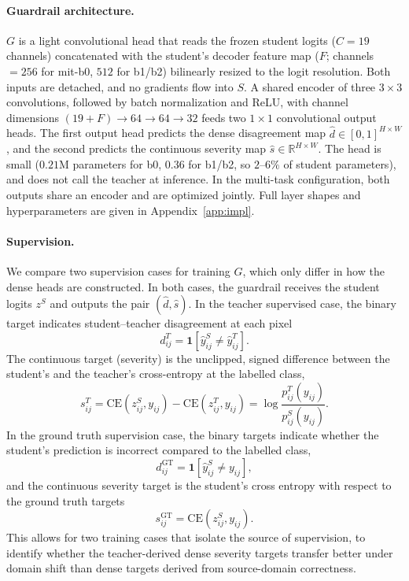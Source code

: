\documentclass{article}
\begin{document}
\paragraph{Guardrail architecture.}
$G$ is a light convolutional head that reads the frozen student logits ($C{=}19$ channels) concatenated with the student's decoder feature map ($F$; channels${=}256$ for mit-b0, $512$ for b1/b2) bilinearly resized to the logit resolution. Both inputs are detached, and no gradients flow into $S$. A shared encoder of three $3{\times}3$ convolutions, followed by batch normalization and ReLU, with channel dimensions $(19{+}F) \rightarrow 64 \rightarrow 64 \rightarrow 32$ feeds two $1{\times}1$ convolutional output heads. The first output head predicts the dense disagreement map $\hat d \in [0,1]^{H \times W}$, and the second predicts the continuous severity map $\hat s \in \mathbb{R}^{H \times W}$. The head is small ($0.21$M parameters for b0, $0.36$ for b1/b2, so $2$--$6\%$ of student parameters), and does not call the teacher at inference. In the multi-task configuration, both outputs share an encoder and are optimized jointly. Full layer shapes and hyperparameters are given in Appendix~\ref{app:impl}.


\paragraph{Supervision.}
We compare two supervision cases for training $G$, which only differ in how the dense heads are constructed. In both cases, the guardrail receives the student logits $z^S$ and outputs the pair $(\hat d, \hat s)$. In the teacher supervised case, the binary target indicates student--teacher disagreement at each pixel
\[
d^{T}_{ij} = \mathbf{1}\!\left[\hat y^S_{ij} \neq \hat y^T_{ij}\right].
\]
The continuous target (severity) is the unclipped, signed difference between the student's and the teacher's cross-entropy at the labelled class,
\[
s^{T}_{ij}
=
\mathrm{CE}\!\left(z^S_{ij}, y_{ij}\right) - \mathrm{CE}\!\left(z^T_{ij}, y_{ij}\right)
=
\log \frac{p^T_{ij}(y_{ij})}{p^S_{ij}(y_{ij})}.
\]
In the ground truth supervision case, the binary targets indicate whether the student's prediction is incorrect compared to the labelled class,
\[
d^{\mathrm{GT}}_{ij} = \mathbf{1}\!\left[\hat y^S_{ij} \neq y_{ij}\right],
\]
and the continuous severity target is the student's cross entropy with respect to the ground truth targets
\[
s^{\mathrm{GT}}_{ij} = \mathrm{CE}\!\left(z^S_{ij}, y_{ij}\right).
\]
This allows for two training cases that isolate the source of supervision, to identify whether the teacher-derived dense severity targets transfer better under domain shift than dense targets derived from source-domain correctness.
\end{document}
